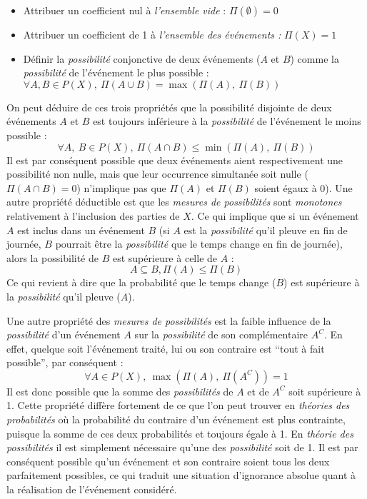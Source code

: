 \begin{itemize}
\item Attribuer un coefficient nul à \emph{l'ensemble vide} :
  \(Π(∅)=0\)
\item Attribuer un coefficient de 1 à \emph{l'ensemble des événements
    :} \(Π(X)=1\)
\item Définir la \emph{possibilité} conjonctive de deux événements
  (\(A\) et \(B\)) comme la \emph{possibilité} de l'événement le plus
  possible : \(∀ A,B ∈ P(X),\ Π(A ∪ B) = \max(Π(A),\ Π(B))\)
\end{itemize}

On peut déduire de ces trois propriétés \autocite{Bouchon-Meunier2007}
que la possibilité disjointe de deux événements \(A\) et \(B\) est
toujours inférieure à la \emph{possibilité} de l'événement le moins
possible :
%
\begin{equation}
  ∀ A,\ B ∈ P(X),\ Π(A ∩ B) ≤ \min(Π(A),\ Π(B))
\end{equation}
%
Il est par conséquent possible que deux événements aient
respectivement une possibilité non nulle, mais que leur occurrence
simultanée soit nulle (\( Π(A ∩ B) = 0\)) n'implique pas que \(Π(A)\)
et \(Π(B)\) soient égaux à 0). Une autre propriété déductible est que
les \emph{mesures de possibilités} sont \emph{monotones} relativement
à l'inclusion des parties de \(X\). Ce qui implique que si un
événement \(A\) est inclus dans un événement \(B\) (\eg si \(A\) est
la \emph{possibilité} qu'il pleuve en fin de journée, \(B\) pourrait
être la \emph{possibilité} que le temps change en fin de journée),
alors la possibilité de \(B\) est supérieure à celle de \(A\) :
%
\begin{equation}
  A \subseteq B, Π(A) ≤ Π(B)
\end{equation}
%
Ce qui revient à dire que la probabilité que le temps change (\(B\))
est supérieure à la \emph{possibilité} qu'il pleuve (\(A\)).

Une autre propriété des \emph{mesures de possibilités} est la faible
influence de la \emph{possibilité} d'un événement \(A\) sur la
\emph{possibilité} de son complémentaire \(A^C\). En effet, quelque
soit l’événement traité, lui ou son contraire est \enquote{tout à fait
  possible}, par conséquent :
%
\begin{equation}
  \label{eq:poss_cont}
  ∀ A ∈ P(X),\ \max(Π(A),\ Π(A^C)) = 1  
\end{equation}
%
Il est donc possible que la somme des \emph{possibilités} de \(A\) et
de \(A^C\) soit supérieure à 1. Cette propriété diffère fortement de
ce que l'on peut trouver en \emph{théories des probabilités} où la
probabilité du contraire d'un événement est plus contrainte, puisque
la somme de ces deux probabilités et toujours égale à 1. En
\emph{théorie des possibilités} il est simplement nécessaire qu'une
des \emph{possibilité} soit de 1. Il est par conséquent possible qu'un
événement et son contraire soient tous les deux parfaitement
possibles, ce qui traduit une situation d'ignorance absolue quant à la
réalisation de l'événement considéré.

